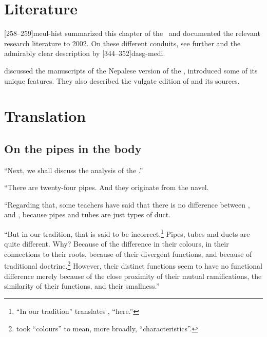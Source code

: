 \begin{refsection}
\section{Literature}

[258--259]{meul-hist} summarized this chapter of the \SS\
and documented the relevant research literature to 2002. On these
different conduits, see further
\cites[404--406]{wuja-2022}[xlvi--xlvii]{wuja-2003}[26--28]{ray-1980}[23--29 
and tables]{kutu-1962} and the admirably clear description by 
[344--352]{dasg-medi}.

\citet{wuja-2023} discussed the manuscripts of the Nepalese version of the \SS, introduced some of its unique features.  They also described the vulgate edition of \citet{vulgate} and its sources.

\newpage

\section{Translation}

\begin{translation}

\subsection{On the pipes in the body}

\item [1]

“Next, we shall discuss the analysis  of the .”

\item[3]

“There are twenty-four pipes.  And they originate from the navel.

“Regarding that, some teachers have said that there is no difference
between \sepl{sirā}{duct}, \sepl{dhamanī}{pipe} and
, because pipes and tubes are just types of duct.
    
“But in our tradition, that is said to be incorrect.\footnote{“In our
    tradition” translates \dev{atra}, “here.”} Pipes, tubes  and ducts are
    quite different. Why? Because of the difference in their colours, in
    their connections to their roots, because of their divergent
    functions, and because of traditional
    doctrine.\footnote{ took  “colours”
        to mean, more broadly, “characteristics”.} However, their distinct
        functions seem to have no functional difference merely because of the
        close proximity of their mutual ramifications, the similarity of their
        functions, and their smallness.”


\end{translation}
\end{refsection}
